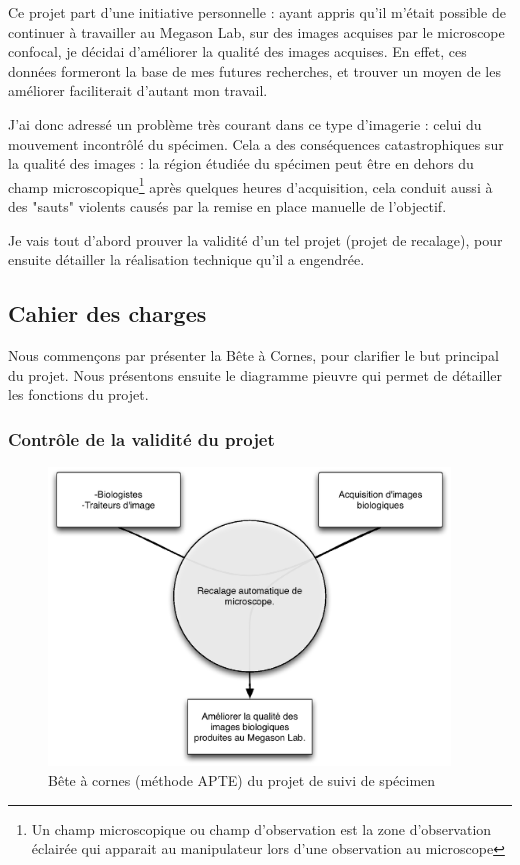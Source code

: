 Ce projet part d'une initiative personnelle : ayant appris qu'il m'était possible de continuer à travailler au Megason Lab, sur des images acquises par le microscope confocal, je décidai d'améliorer la qualité des images acquises. En effet, ces données formeront la base de mes futures recherches, et trouver un moyen de les améliorer faciliterait d'autant mon travail.

J'ai donc adressé un problème très courant dans ce type d'imagerie : 
celui du mouvement incontrôlé du spécimen.
Cela a des conséquences catastrophiques sur la qualité des images : 
la région étudiée du spécimen peut être en dehors 
du champ microscopique\footnote{Un champ microscopique ou champ d'observation est la zone d'observation éclairée qui apparait au manipulateur lors d'une observation au microscope}
après quelques heures d'acquisition,
cela conduit aussi à des "sauts" violents causés par la remise en place manuelle de l'objectif.

Je vais tout d'abord prouver la validité d'un tel projet (projet de recalage), pour ensuite détailler la réalisation technique qu'il a engendrée.
\subsection{Cahier des charges}
Nous commençons par présenter la Bête à Cornes,
pour clarifier le but principal du projet. Nous présentons ensuite le diagramme pieuvre qui permet de détailler les fonctions du projet.

\subsubsection{Contrôle de la validité du projet}
\begin{figure}[h]
\begin{center}
\leavevmode
\includegraphics[width=0.95\textwidth]{pictures/RecalBAC}
\end{center}
\caption{Bête à cornes (méthode {APTE\textregistered}) du projet de suivi de spécimen}
\label{fig:BACRecal}
\end{figure}

